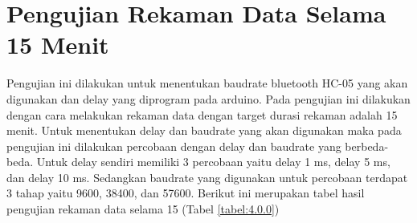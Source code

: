 \section{Pengujian Rekaman Data Selama 15 Menit}
\vspace{1ex}
Pengujian ini dilakukan untuk menentukan baudrate bluetooth HC-05 yang akan digunakan dan delay yang diprogram pada arduino. Pada pengujian ini dilakukan dengan cara melakukan rekaman data dengan target durasi rekaman adalah 15 menit. Untuk menentukan delay dan baudrate yang akan digunakan maka pada pengujian ini dilakukan percobaan dengan delay dan baudrate yang berbeda-beda. Untuk delay sendiri memiliki 3 percobaan yaitu delay 1 ms, delay 5 ms, dan delay 10 ms. Sedangkan baudrate yang digunakan untuk percobaan terdapat 3 tahap yaitu 9600, 38400, dan 57600. Berikut ini merupakan tabel hasil pengujian rekaman data selama 15 (Tabel \ref{tabel:4.0.0})
